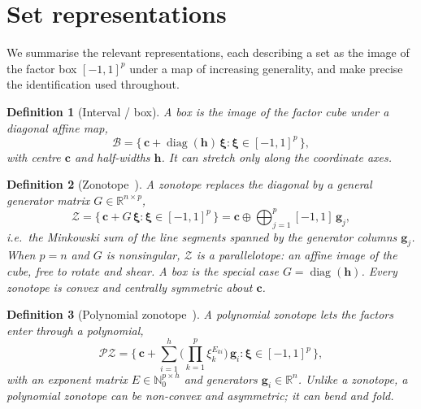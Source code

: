 \documentclass[11pt]{article}
\newtheorem{definition}{Definition}
\newcommand{\R}{\mathbb{R}}
\newcommand{\bxi}{\bm{\xi}}
\newcommand{\bg}{\bm{g}}
\newcommand{\bc}{\bm{c}}
\newcommand{\diag}{\operatorname{diag}}
\begin{document}
\section{Set representations}
\label{sec:representations}

We summarise the relevant representations, each describing a set as the image of
the factor box $[-1,1]^p$ under a map of increasing generality, and make precise
the identification used throughout.

\begin{definition}[Interval / box]
A box is the image of the factor cube under a diagonal affine map,
\begin{equation}
  \mathcal{B} = \{\, \bc + \diag(\bm{h})\,\bxi : \bxi \in [-1,1]^p \,\},
  \label{eq:box}
\end{equation}
with centre $\bc$ and half-widths $\bm{h}$. It can stretch only along the
coordinate axes.
\end{definition}

\begin{definition}[Zonotope~\citep{girard2005reachability}]
A zonotope replaces the diagonal by a general \emph{generator matrix}
$G \in \R^{n\times p}$,
\begin{equation}
  \mathcal{Z} = \{\, \bc + G\,\bxi : \bxi \in [-1,1]^p \,\}
  = \bc \oplus \bigoplus_{j=1}^{p} [-1,1]\, \bg_j,
  \label{eq:zono}
\end{equation}
i.e.\ the Minkowski sum of the line segments spanned by the generator columns
$\bg_j$. When $p = n$ and $G$ is nonsingular, $\mathcal{Z}$ is a
\emph{parallelotope}: an affine image of the cube, free to rotate and shear. A
box is the special case $G = \diag(\bm{h})$. Every zonotope is convex and
centrally symmetric about $\bc$.
\end{definition}

\begin{definition}[Polynomial zonotope~\citep{althoff2013reachability,
kochdumper2021sparse}]
A polynomial zonotope lets the factors enter through a polynomial,
\begin{equation}
  \mathcal{PZ} = \Big\{\, \bc + \sum_{i=1}^{h}
    \Big(\textstyle\prod_{k=1}^{p} \xi_k^{E_{ki}}\Big)\, \bg_i
    : \bxi \in [-1,1]^p \,\Big\},
  \label{eq:pz}
\end{equation}
with an exponent matrix $E \in \mathbb{N}_0^{p \times h}$ and generators
$\bg_i \in \R^n$. Unlike a zonotope, a polynomial zonotope can be non-convex and
asymmetric; it can bend and fold.
\end{definition}
\end{document}
